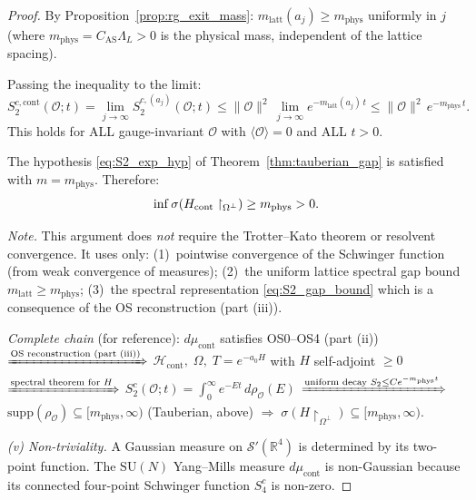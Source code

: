 \documentclass[11pt,a4paper]{amsart}
\theoremstyle{definition}
\newcommand{\SU}{\mathrm{SU}}
\newcommand{\R}{\mathbb{R}}
\newcommand{\supp}{\mathrm{supp}}
\begin{document}
\begin{proof}
By Proposition~\ref{prop:rg_exit_mass}: $m_{\mathrm{latt}}(a_j) \ge m_{\mathrm{phys}}$
uniformly in $j$ (where $m_{\mathrm{phys}} = C_{\mathrm{AS}}\Lambda_L > 0$
is the physical mass, independent of the lattice spacing).

Passing the inequality to the limit:
\[
  S_2^{c,\mathrm{cont}}(\mathcal{O}; t)
  = \lim_{j\to\infty} S_2^{c,(a_j)}(\mathcal{O}; t)
  \le \|\mathcal{O}\|^2\,\lim_{j\to\infty} e^{-m_{\mathrm{latt}}(a_j)\,t}
  \le \|\mathcal{O}\|^2\, e^{-m_{\mathrm{phys}}\,t}.
\]
This holds for ALL gauge-invariant $\mathcal{O}$ with $\langle\mathcal{O}\rangle = 0$
and ALL $t > 0$.

The hypothesis \eqref{eq:S2_exp_hyp} of Theorem~\ref{thm:tauberian_gap} is
satisfied with $m = m_{\mathrm{phys}}$.  Therefore:
\[
  \inf\sigma(H_{\mathrm{cont}}\restriction_{\Omega^\perp})
  \ge m_{\mathrm{phys}} > 0. \qedhere
\]

\emph{Note.}
This argument does \emph{not} require the Trotter--Kato theorem or resolvent
convergence.  It uses only: (1)~pointwise convergence of the Schwinger function
(from weak convergence of measures); (2)~the uniform lattice spectral gap bound
$m_{\mathrm{latt}} \ge m_{\mathrm{phys}}$; (3)~the spectral representation
\eqref{eq:S2_gap_bound} which is a consequence of the OS reconstruction (part (iii)).

\emph{Complete chain} (for reference):
$d\mu_{\mathrm{cont}}$ satisfies OS0--OS4 (part (ii))
$\xRightarrow{\text{OS reconstruction (part (iii))}}$
$\mathcal{H}_{\mathrm{cont}},\;\Omega,\;T = e^{-a_0 H}$ with $H$ self-adjoint $\ge 0$
$\xRightarrow{\text{spectral theorem for } H}$
$S_2^c(\mathcal{O};t) = \int_0^\infty e^{-Et}\,d\rho_{\mathcal{O}}(E)$
$\xRightarrow{\text{uniform decay } S_2 \le Ce^{-m_{\mathrm{phys}}t}}$
$\supp(\rho_{\mathcal{O}}) \subseteq [m_{\mathrm{phys}},\infty)$ (Tauberian, above)
$\Rightarrow\;\sigma(H\restriction_{\Omega^\perp}) \subseteq [m_{\mathrm{phys}},\infty)$.

\emph{(v) Non-triviality.}
A Gaussian measure on $\mathcal{S}'(\R^4)$ is determined by its two-point function.
The $\SU(N)$ Yang--Mills measure $d\mu_{\mathrm{cont}}$ is non-Gaussian because its
connected four-point Schwinger function $S_4^c$ is non-zero.


\end{proof}
\end{document}
